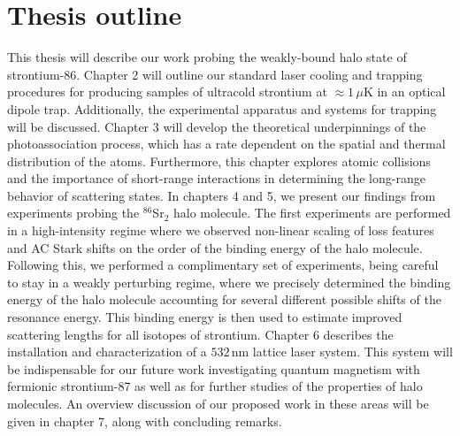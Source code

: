 \section{Thesis outline} \label{sec:outline}
This thesis will describe our work probing the weakly-bound halo state of strontium-86.
Chapter 2 will outline our standard laser cooling and trapping procedures for producing samples of ultracold strontium at $\approx1\,\mu$K in an optical dipole trap. 
Additionally, the experimental apparatus and systems for trapping will be discussed.
Chapter 3 will develop the theoretical underpinnings of the photoassociation process, which has a rate dependent on the spatial and thermal distribution of the atoms.
Furthermore, this chapter explores atomic collisions and the importance of short-range interactions in determining the long-range behavior of scattering states.
In chapters 4 and 5, we present our findings from experiments probing the $^{86}$Sr$_2$ halo molecule.
The first experiments are performed in a high-intensity regime where we observed non-linear scaling of loss features and AC Stark shifts on the order of the binding energy of the halo molecule.
Following this, we performed a complimentary set of experiments, being careful to stay in a weakly perturbing regime, where we precisely determined the binding energy of the halo molecule accounting for several different possible shifts of the resonance energy.
This binding energy is then used to estimate improved scattering lengths for all isotopes of strontium.
Chapter 6 describes the installation and characterization of a $532$\,nm lattice laser system.
This system will be indispensable for our future work investigating quantum magnetism with fermionic strontium-87 as well as for further studies of the properties of halo molecules.
An overview discussion of our proposed work in these areas will be given in chapter 7, along with concluding remarks.







%
%
%
%
%
%
%
%
%


